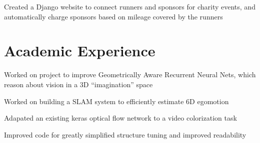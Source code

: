 \documentclass[letterpaper]{deedy-resume} %
\begin{document}
\begin{minipage}[t]{0.66\textwidth}
\sectionspace %


\begin{tightitemize}
    \item Created a Django website to connect runners and sponsors for charity events, and automatically charge sponsors based on mileage covered by the runners
\end{tightitemize}

\sectionspace %


\section{Academic Experience}


\begin{tightitemize}
  \item Worked on project to improve Geometrically Aware Recurrent Neural Nets, which reason about vision in a 3D ``imagination'' space
  \item Worked on building a SLAM system to efficiently estimate 6D egomotion
\end{tightitemize}

\sectionspace %



\begin{tightitemize}
    \item Adapated an existing keras optical flow network to a video colorization task
    \item Improved code for greatly simplified structure tuning and improved readability
\end{tightitemize}


\end{minipage}
\end{document}

